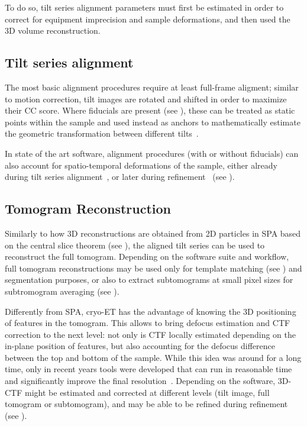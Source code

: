 To do so, tilt series alignment parameters must first be estimated in order to correct for equipment imprecision and sample deformations, and then used the 3D volume reconstruction.

\subsection{Tilt series alignment}\label{et_tilt_series_alignment}
The most basic alignment procedures require at least full-frame aligment; similar to motion correction, tilt images are rotated and shifted in order to maximize their CC score.
Where fiducials are present (see ), these can be treated as static points within the sample and used instead as anchors to mathematically estimate the geometric transformation between different tilts~\cite{nicastroMolecularArchitectureAxonemes2006,heumannClusteringVarianceMaps2011,castano-diezDynamoCatalogueGeometrical2017}.

In state of the art software, alignment procedures (with or without fiducials) can also account for spatio-temporal deformations of the sample, either already during tilt series alignment~\cite{zhengAreTomoIntegratedSoftware2022}, or later during refinement~\cite{tegunovMultiparticleCryoEMRefinement2021,burtImageProcessingPipeline2024,galaz-montoyaSingleParticleTomography2015,chenCompleteDataProcessing2019} (see ).

\subsection{Tomogram Reconstruction}\label{et_tomo_reconstruction}
Similarly to how 3D reconstructions are obtained from 2D particles in SPA based on the central slice theorem (see ), the aligned tilt series can be used to reconstruct the full tomogram.
Depending on the software suite and workflow, full tomogram reconstructions may be used only for template matching (see ) and segmentation purposes, or also to extract subtomograms at small pixel sizes for subtromogram averaging (see ).

Differently from SPA, cryo-ET has the advantage of knowing the 3D positioning of features in the tomogram.
This allows to bring defocus estimation and CTF correction to the next level: not only is CTF locally estimated depending on the in-plane position of features, but also accounting for the defocus difference between the top and bottom of the sample.
While this idea was around for a long time, only in recent years tools were developed that can run in reasonable time and significantly improve the final resolution~\cite{turonovaEfficient3DCTFCorrection2017,tegunovRealtimeCryoelectronMicroscopy2019}. 
Depending on the software, 3D-CTF might be estimated and corrected at different levels (tilt image, full tomogram or subtomogram), and may be able to be refined during refinement (see ).


